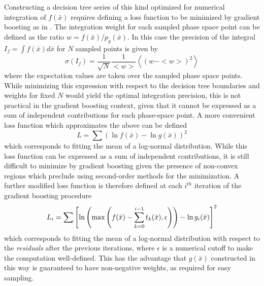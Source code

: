 \documentclass[a4paper,11pt]{article}
\begin{document}
Constructing a decision tree series of this kind optimized for numerical integration of $f(\bar x)$ requires defining a loss function to be minimized by gradient boosting as in \cite{Friedman00greedyfunction}.  The integration weight for each sampled phase space point can be defined as the ratio $w = f(\bar x)/p_g(\bar x)$.  In this case the precision of the integral $I_f = \int f(\bar x)d\bar x$ for $N$ sampled points is given by 
\begin{equation}
 \sigma(I_f) = \frac{1}{\sqrt{N}}\frac{1}{<w>}\left<\left(w - <w>\right)^2\right>
 \label{eqn:uncert}
\end{equation}
where the expectation values are taken over the sampled phase space points.  While minimizing this expression with respect to the decision tree boundaries and weights for fixed $N$ would yield the optimal integration precision, this is not practical in the gradient boosting context, given that it cannot be expressed as a sum of independent contributions for each phase-space point.  A more convenient loss function which approximates the above can be defined
\begin{equation}
 L = \sum\left(\ln f(\bar x) - \ln g(\bar x)\right)^2
\end{equation}
which corresponds to fitting the mean of a log-normal distribution.  While this loss function can be expressed as a sum of independent contributions, it is still difficult to minimize by gradient boosting given the presence of non-convex regions which preclude using second-order methods for the minimization.  A further modified loss function is therefore defined at each $i^{th}$ iteration of the gradient boosting procedure
\begin{equation}
 L_i = \sum\left[\ln\left(\textnormal{max}\left(f(\bar x) - \sum_{k=0}^{i-1}t_k(\bar x),\epsilon\right)\right) - \ln g_i(\bar x)\right]^2
\end{equation}
which corresponds to fitting the mean of a log-normal distribution with respect to the \textit{residuals} after the previous iterations, where $\epsilon$ is a numerical cutoff to make the computation well-defined.  This has the advantage that $g(\bar x)$ constructed in this way is guaranteed to have non-negative weights, as required for easy sampling.
\end{document}
